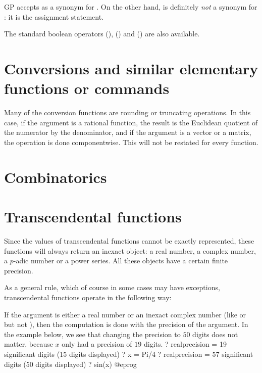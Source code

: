 GP accepts \kbd{<>} as a synonym for \kbd{!=}. On the other hand, \kbd{=} is
definitely \emph{not} a synonym for \kbd{==}: it is the assignment statement.

The standard boolean operators \kbd{||} (), \kbd{\&\&}
() and \kbd{!} () are also available.

\section{Conversions and similar elementary functions or commands}
\label{se:conversion}

\noindent
Many of the conversion functions are rounding or truncating operations. In
this case, if the argument is a rational function, the result is the
Euclidean quotient of the numerator by the denominator, and if the argument
is a vector or a matrix, the operation is done componentwise. This will not
be restated for every function.


\section{Combinatorics}\label{se:combinat}


\section{Transcendental functions}\label{se:trans}

Since the values of transcendental functions cannot be exactly represented,
these functions will always return an inexact object: a real number,
a complex number, a $p$-adic number or a power series.  All these objects
have a certain finite precision.

As a general rule, which of course in some cases may have exceptions,
transcendental functions operate in the following way:

\item If the argument is either a real number or an inexact complex number
(like  or  but not ), then the
computation is done with the precision of the argument.
In the example below, we see that changing the precision to $50$ digits does
not matter, because $x$ only had a precision of $19$ digits.
\bprog
? 
   realprecision = 19 significant digits (15 digits displayed)
? x = Pi/4
? 
   realprecision = 57 significant digits (50 digits displayed)
? sin(x)
@eprog

